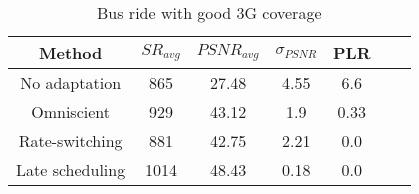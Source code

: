 \begin{table}
  \begin{center}
\begin{tabular}{ccccccc} \hline
Method & $SR_{avg}$ & $PSNR_{avg}$ & $\sigma_{PSNR}$ & PLR \\ \hline
No adaptation   & 865   & 27.48 & 4.55  & 6.6 \\
Omniscient      & 929   & 43.12 & 1.9   & 0.33 \\ 
Rate-switching  & 881   & 42.75 & 2.21  & 0.0  \\ 
Late scheduling & 1014  & 48.43 & 0.18 & 0.0  \\ \hline
\end{tabular}
\caption{Bus ride with good 3G coverage}
\label{table-glass-sim7res}
\end{center}
\end{table}

